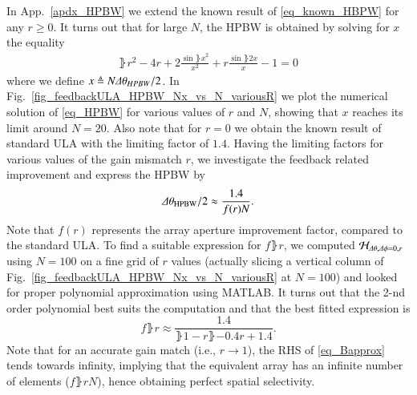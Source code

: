 \par In App.~\ref{apdx_HPBW} we extend the known result of \eqref{eq_known_HBPW} for any $r\geq 0$. It turns out that for large $N$, the HPBW is obtained by solving for $x$ the equality
\begin{equation}\label{eq_HPBW}
        \begin{split}
            \rBrace{r^{2}-4r+2}\frac{\sin{\rBrace{x}}^{2}}{x^{2}}+r\frac{\sin{\rBrace{2x}}}{x}-1=0
        \end{split}
\end{equation}
where we define $x\triangleq{} N\Delta\theta_{HPBW}/2$. In Fig.~\ref{fig_feedbackULA_HPBW_Nx_vs_N_variousR} we plot the numerical solution of \eqref{eq_HPBW} for various values of $r$ and $N$, showing that $x$ reaches its limit around $N=20$. Also note that for $r=0$ we obtain the known result of standard ULA with the limiting factor of $1.4$.
Having the limiting factors for various values of the gain mismatch $r$, we investigate the feedback related improvement and express the HPBW by
\[
\Delta\theta_{\text{HPBW}}/2\approx \frac{1.4}{f(r)N}.
\]
Note that $f(r)$ represents the array aperture improvement factor, compared to the standard ULA.
To find a suitable expression for $f\rBrace{r}$, we computed $\mathcal{H}_{\Delta\theta,\Delta\phi=0,r}$ using $N=100$ on a fine grid of $r$ values (actually slicing a vertical column of Fig.~\ref{fig_feedbackULA_HPBW_Nx_vs_N_variousR} at $N=100$) and looked for proper polynomial approximation using MATLAB\textsuperscript{\textregistered}.
It turns out that the 2-nd order polynomial best suits the computation and that the best fitted expression is 
\begin{equation}
    \label{eq_Bapprox}
    f\rBrace{r}\approx\frac{1.4}{\rBrace{1-r}\rBrace{-0.4r+1.4}}.
\end{equation}
Note that for an accurate gain match (i.e., $r\to1$), the RHS of \eqref{eq_Bapprox} tends towards infinity, implying that the equivalent array has an infinite number  of elements ($f\rBrace{r}N$), hence obtaining perfect spatial selectivity.
